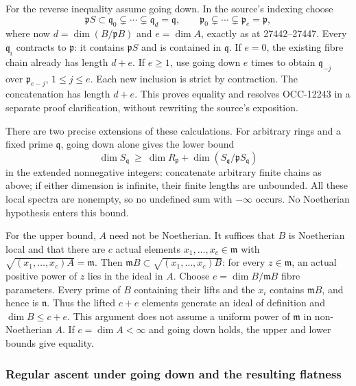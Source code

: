For the reverse inequality assume going down. In the source's indexing choose \[
 \mathfrak pS\subset\mathfrak q_0\subsetneq\cdots
 \subsetneq\mathfrak q_d=\mathfrak q,\qquad
 \mathfrak p_0\subsetneq\cdots\subsetneq\mathfrak p_e=\mathfrak p,
\] where now \(d=\dim(B/\mathfrak pB)\) and \(e=\dim A\), exactly as at 27442--27447. Every \(\mathfrak q_i\) contracts to \(\mathfrak p\): it contains \(\mathfrak pS\) and is contained in \(\mathfrak q\). If \(e=0\), the existing fibre chain already has length \(d+e\). If \(e\geq1\), use going down \(e\) times to obtain \(\mathfrak q_{-j}\) over \(\mathfrak p_{e-j}\), \(1\leq j\leq e\). Each new inclusion is strict by contraction. The concatenation has length \(d+e\). This proves equality and resolves OCC-12243 in a separate proof clarification, without rewriting the source's exposition.

There are two precise extensions of these calculations. For arbitrary rings and a fixed prime \(\mathfrak q\), going down alone gives the lower bound \[
 \dim S_{\mathfrak q}\ \geq\
 \dim R_{\mathfrak p}+\dim(S_{\mathfrak q}/\mathfrak pS_{\mathfrak q})
\] in the extended nonnegative integers: concatenate arbitrary finite chains as above; if either dimension is infinite, their finite lengths are unbounded. All these local spectra are nonempty, so no undefined sum with \(-\infty\) occurs. No Noetherian hypothesis enters this bound.

For the upper bound, \(A\) need not be Noetherian. It suffices that \(B\) is Noetherian local and that there are \(c\) actual elements \(x_1,\ldots,x_c\in\mathfrak m\) with \(\sqrt{(x_1,\ldots,x_c)A}=\mathfrak m\). Then \(\mathfrak mB\subset\sqrt{(x_1,\ldots,x_c)B}\): for every \(z\in
\mathfrak m\), an actual positive power of \(z\) lies in the ideal in \(A\). Choose \(e=\dim B/\mathfrak mB\) fibre parameters. Every prime of \(B\) containing their lifts and the \(x_i\) contains \(\mathfrak mB\), and hence is \(\mathfrak n\). Thus the lifted \(c+e\) elements generate an ideal of definition and \(\dim B\leq c+e\). This argument does not assume a uniform power of \(\mathfrak m\) in non-Noetherian \(A\). If \(c=\dim A<\infty\) and going down holds, the upper and lower bounds give equality.

\subsubsection{Regular ascent under going down and the resulting flatness}\label{regular-ascent-under-going-down-and-the-resulting-flatness}

